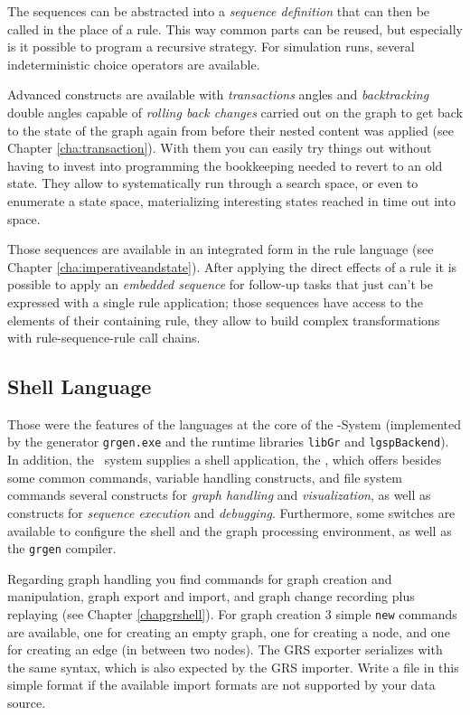 The sequences can be abstracted into a \emph{sequence definition} that can then be called in the place of a rule.
This way common parts can be reused, but especially is it possible to program a recursive strategy.
For simulation runs, several indeterministic choice operators are available.

Advanced constructs are available with \emph{transactions} angles and \emph{backtracking} double angles capable of \emph{rolling back changes} carried out on the graph to get back to the state of the graph again from before their nested content was applied (see Chapter \ref{cha:transaction}).
With them you can easily try things out without having to invest into programming the bookkeeping needed to revert to an old state.
They allow to systematically run through a search space, or even to enumerate a state space, materializing interesting states reached in time out into space.

Those sequences are available in an integrated form in the rule language (see Chapter \ref{cha:imperativeandstate}).
After applying the direct effects of a rule it is possible to apply an \emph{embedded sequence} for follow-up tasks that just can't be expressed with a single rule application; those sequences have access to the elements of their containing rule, they allow to build complex transformations with rule-sequence-rule call chains.
		
\subsection{Shell Language}
Those were the features of the languages at the core of the \GrG-System (implemented by the generator \texttt{grgen.exe} and the runtime libraries \texttt{libGr} and \texttt{lgspBackend}).
In addition, the \GrG\ system supplies a shell application, the \GrShell,
which offers besides some common commands, variable handling constructs, and file system commands several constructs for \emph{graph handling} and \emph{visualization}, as well as constructs for \emph{sequence execution} and \emph{debugging}.
Furthermore, some switches are available to configure the shell and the graph processing environment, as well as the \texttt{grgen} compiler.

Regarding graph handling you find commands for graph creation and manipulation, graph export and import, and graph change recording plus replaying (see Chapter \ref{chapgrshell}).
For graph creation 3 simple \texttt{new} commands are available, one for creating an empty graph, one for creating a node, and one for creating an edge (in between two nodes).
The GRS exporter serializes with the same syntax, which is also expected by the GRS importer.
Write a file in this simple format if the available import formats are not supported by your data source.

